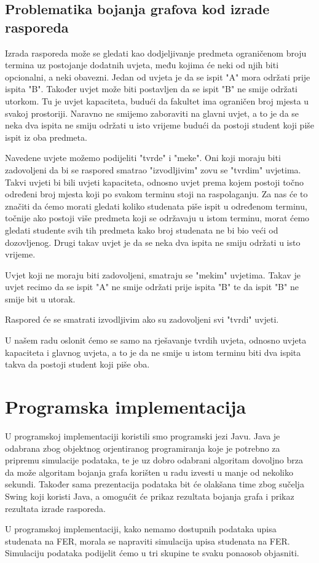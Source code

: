 \documentclass[times, utf8, zavrsni, numeric]{fer}
\begin{document}
\newpage
\section{Problematika bojanja grafova kod izrade rasporeda}
Izrada rasporeda može se gledati kao dodjeljivanje predmeta ograničenom broju termina uz postojanje dodatnih uvjeta, među kojima će neki od njih biti opcionalni, a neki obavezni.  Jedan od uvjeta je da se ispit "A" mora održati prije ispita "B". Također uvjet može biti postavljen da se ispit "B" ne smije održati utorkom. Tu je uvjet kapaciteta, budući da fakultet ima ograničen broj mjesta u svakoj prostoriji. Naravno ne smijemo zaboraviti na glavni uvjet, a to je da se neka dva ispita ne smiju održati u isto vrijeme budući da postoji student koji piše ispit iz oba predmeta.\par
Navedene uvjete možemo podijeliti "tvrde" i "meke". Oni koji moraju biti zadovoljeni da bi se raspored smatrao "izvodljivim" zovu se "tvrdim" uvjetima. Takvi uvjeti bi bili uvjeti kapaciteta, odnosno uvjet prema kojem postoji točno određeni broj mjesta koji po svakom terminu stoji na raspolaganju. Za nas će to značiti da ćemo morati gledati koliko studenata piše ispit u određenom terminu, točnije ako postoji više predmeta koji se održavaju u istom terminu, morat ćemo gledati studente svih tih predmeta kako broj studenata ne bi bio veći od dozovljenog. Drugi takav uvjet je da se neka dva ispita ne smiju održati u isto vrijeme.\par
Uvjet koji ne moraju biti zadovoljeni, smatraju se "mekim" uvjetima. Takav je uvjet recimo da se ispit "A" ne smije održati prije ispita "B" te da ispit "B" ne smije bit u utorak.\par
Raspored će se smatrati izvodljivim ako su zadovoljeni svi "tvrdi" uvjeti.\par
U našem radu oslonit ćemo se samo na rješavanje tvrdih uvjeta, odnosno uvjeta kapaciteta i glavnog uvjeta, a to je da ne smije u istom terminu biti dva ispita takva da postoji student koji piše oba.

\chapter{Programska implementacija}
U programskoj implementaciji koristili smo programski jezi Javu. Java je odabrana zbog objektnog orjentiranog programiranja koje je potrebno za pripremu simulacije podataka, te je uz dobro odabrani algoritam dovoljno brza da može algoritam bojanja grafa korišten u radu izvesti u manje od nekoliko sekundi. Također sama prezentacija podataka bit će olakšana time zbog sučelja Swing koji koristi Java, a omogućit će prikaz rezultata bojanja grafa i prikaz rezultata izrade rasporeda.\par
U  programskoj implementaciji, kako nemamo dostupnih podataka upisa studenata na FER, morala se napraviti simulacija upisa studenata na FER. Simulaciju podataka podijelit ćemo u tri skupine te svaku ponaosob objasniti.
\end{document}
